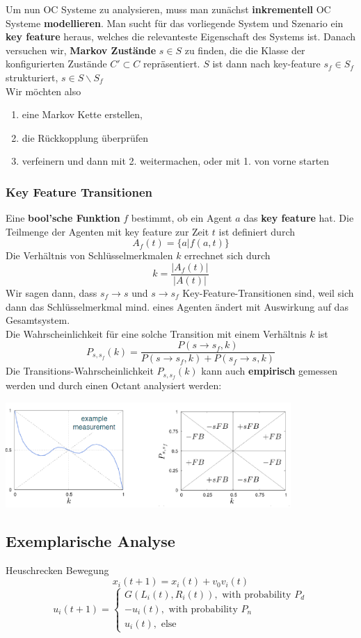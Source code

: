 \documentclass[a4paper]{article}
\begin{document}
Um nun OC Systeme zu analysieren, muss man zunächst \textbf{inkrementell} OC Systeme \textbf{modellieren}. Man sucht für das vorliegende System und Szenario ein \textbf{key feature} heraus, welches die relevanteste Eigenschaft des Systems ist. Danach versuchen wir, \textbf{Markov Zustände} $s\in S$ zu finden, die die Klasse der konfigurierten Zustände $C' \subset C$ repräsentiert. $S$ ist dann nach key-feature $s_f\in S_f$ strukturiert, $s \in S\backslash S_f$\\

Wir möchten also 
\begin{enumerate}
	\item eine Markov Kette erstellen,
	\item die Rückkopplung überprüfen
	\item verfeinern und dann mit 2. weitermachen, oder mit 1. von vorne starten
\end{enumerate}
\subsubsection{Key Feature Transitionen}
Eine \textbf{bool'sche Funktion} $f$ bestimmt, ob ein Agent $a$ das \textbf{key feature} hat. Die Teilmenge der Agenten mit key feature zur Zeit $t$ ist definiert durch
$$A_f(t)=\{a|f(a,t)\}$$
Die Verhältnis von Schlüsselmerkmalen $k$ errechnet sich durch
$$k=\dfrac{|A_f(t)|}{|A(t)|}$$
Wir sagen dann, dass $s_f\rightarrow s$ und $s\rightarrow s_f$ Key-Feature-Transitionen sind, weil sich dann das Schlüsselmerkmal mind. eines Agenten ändert mit Auswirkung auf das Gesamtsystem.\\
 Die Wahrscheinlichkeit für eine solche Transition mit einem Verhältnis $k$ ist
$$P_{s,s_f}(k)=\dfrac{P(s\rightarrow s_f,k)}{P(s\rightarrow s_f,k)+P(s_f\rightarrow s,k)}$$
Die Transitions-Wahrscheinlichkeit $P_{s,s_f}(k)$ kann auch \textbf{empirisch} gemessen werden und durch einen Octant analysiert werden: 
\begin{center}
	\includegraphics[height = 4cm]{TP.png}
\end{center}

\subsection{Exemplarische Analyse}	
Heuschrecken Bewegung\\
$$x_i(t+1) = x_i(t) + v_0 v_i(t)$$
$$u_i(t+1)=\left\{
\begin{matrix}
	G(L_i(t), R_i(t)),\text{ with probability }P_d\\
	-u_i(t), \text{ with probability }P_n\\
	u_i(t),\text{ else}
\end{matrix}
\right.$$
\end{document}
